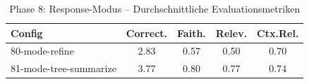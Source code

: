 \begin{table}[H]
\centering
\small
\begin{tabular}{lcccc}
\toprule
Config & Correct. & Faith. & Relev. & Ctx.Rel. \\
\midrule
80-mode-refine & 2.83 & 0.57 & 0.50 & 0.70 \\
81-mode-tree-summarize & 3.77 & 0.80 & 0.77 & 0.74 \\
\bottomrule
\end{tabular}
\caption{Phase 8: Response-Modus -- Durchschnittliche Evaluationsmetriken}
\label{tab:phase8_eval}
\end{table}